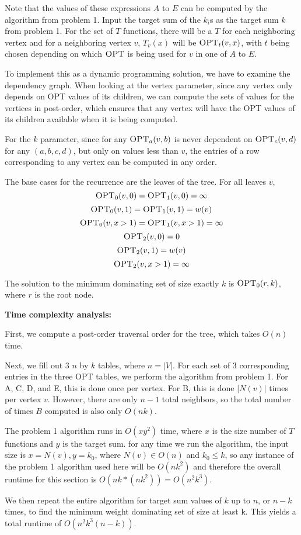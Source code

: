 \documentclass{article}
\begin{document}
Note that the values of these expressions $A$ to $E$ can be computed by the
algorithm from problem 1. Input the target sum of the $k_i$s as the target sum
$k$ from problem 1. For the set of $T$ functions, there will be a $T$ for each
neighboring vertex and for a neighboring vertex $v$, $T_v(x)$ will be
$\textsc{OPT}_t(v, x)$, with $t$ being chosen depending on which
$\textsc{OPT}$ is being used for $v$ in one of $A$ to $E$.

To implement this as a dynamic programming solution, we have to examine the
dependency graph. When looking at the vertex parameter, since any vertex only
depends on \textsc{OPT} values of its children, we can compute the
sets of values for the vertices in post-order, which ensures that any vertex
will have the \textsc{OPT} values of its children available when it is being
computed.

For the $k$ parameter, since for any $\textsc{OPT}_a(v,b)$ is never dependent
on $\textsc{OPT}_c(v,d)$ for any $(a,b,c,d)$, but only on values less than
$v$, the entries of a row corresponding to any vertex can be computed in any
order. 

The base cases for the recurrence are the leaves of the tree. For all leaves
$v$,
$$\textsc{OPT}_0(v,0) = \textsc{OPT}_1(v,0) = \infty$$
$$\textsc{OPT}_0(v,1) = \textsc{OPT}_1(v,1) = w(v)$$
$$\textsc{OPT}_0(v,x > 1) = \textsc{OPT}_1(v, x > 1) = \infty$$
$$\textsc{OPT}_2(v,0) = 0$$
$$\textsc{OPT}_2(v,1) = w(v)$$
$$\textsc{OPT}_2(v, x > 1) = \infty$$


The solution to the minimum dominating set of size exactly $k$ is
$\textsc{OPT}_0(r,k)$, where $r$ is the root node.

\textbf{Time complexity analysis:}

First, we compute a post-order traversal order for the tree, which takes
$O(n)$ time. 

Next, we fill out 3 $n$ by $k$ tables, where $n = |V|$. For each set of 3
corresponding entries in the three \textsc{OPT} tables, we perform the
algorithm from problem 1. For A, C, D, and E, this is done once per vertex. For B, this is done $|N(v)|$
times per vertex $v$. However, there are only $n-1$ total neighbors, so the
total number of times $B$ computed is also only $O(nk)$.

The problem 1 algorithm runs in $O(xy^2)$ time, where $x$ is the size number
of $T$ functions and $y$ is the target sum. for any time we run the algorithm,
the input size is $x = N(v), y = k_0$, where $N(v) \in O(n)$ and $k_0 \leq k$,
so any instance of the problem 1 algorithm used here will be $O(nk^2)$ and
therefore the overall runtime for this section is $O(nk*(nk^2)) = O(n^2k^3)$.

We then repeat the entire algorithm for target sum values of
$k$ up to $n$, or $n - k$ times, to find the minimum weight dominating set of size at least k.
This yields a total runtime of $O(n^2k^3(n-k))$.
\end{document}
